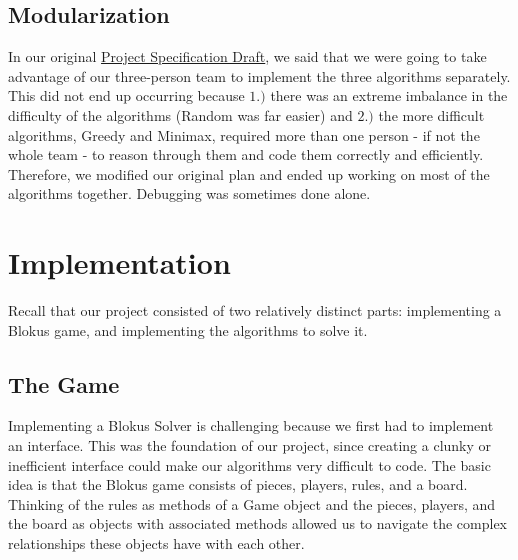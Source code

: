 \documentclass[11pt]{article}
\begin{document}
\subsection{Modularization}

In our original \href{run:report/Final Project Specification (Draft).pdf}{Project Specification Draft}, we said that we were going to take advantage of our three-person team to implement the three algorithms separately. This did not end up occurring because $1.)$ there was an extreme imbalance in the difficulty of the algorithms (Random was far easier) and $2.)$ the more difficult algorithms, Greedy and Minimax, required more than one person - if not the whole team - to reason through them and code them correctly and efficiently. Therefore, we modified our original plan and ended up working on most of the algorithms together. Debugging was sometimes done alone.


\pagebreak


\section{Implementation}

Recall that our project consisted of two relatively distinct parts: implementing a Blokus game, and implementing the algorithms to solve it.

\subsection{The Game}

Implementing a Blokus Solver is challenging because we first had to implement an interface. This was the foundation of our project, since creating a clunky or inefficient interface could make our algorithms very difficult to code. The basic idea is that the Blokus game consists of pieces, players, rules, and a board. Thinking of the rules as methods of a Game object and the pieces, players, and the board as objects with associated methods allowed us to navigate the complex relationships these objects have with each other.

\bigskip
\end{document}
